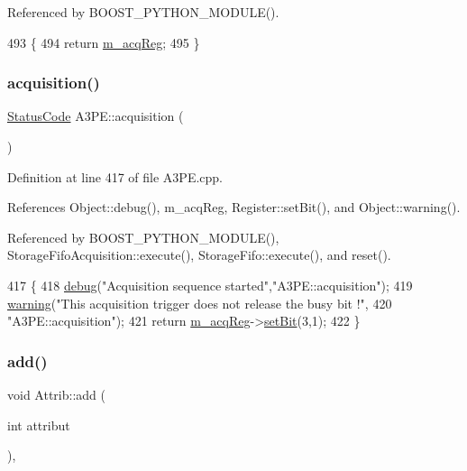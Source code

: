 Referenced by B\+O\+O\+S\+T\+\_\+\+P\+Y\+T\+H\+O\+N\+\_\+\+M\+O\+D\+U\+L\+E().


\begin{DoxyCode}
493                     \{
494     \textcolor{keywordflow}{return} \hyperlink{classA3PE_abaf426f4c9192537117b77f9f4821e04}{m\_acqReg};
495   \}
\end{DoxyCode}
\mbox{\label{classA3PE_a035886b99761cc4f3c342ff0b4e44f59}} 
\subsubsection{\texorpdfstring{acquisition()}{acquisition()}}
{\footnotesize\ttfamily \hyperlink{classStatusCode}{Status\+Code} A3\+P\+E\+::acquisition (\begin{DoxyParamCaption}{ }\end{DoxyParamCaption})}



Definition at line 417 of file A3\+P\+E.\+cpp.



References Object\+::debug(), m\+\_\+acq\+Reg, Register\+::set\+Bit(), and Object\+::warning().



Referenced by B\+O\+O\+S\+T\+\_\+\+P\+Y\+T\+H\+O\+N\+\_\+\+M\+O\+D\+U\+L\+E(), Storage\+Fifo\+Acquisition\+::execute(), Storage\+Fifo\+::execute(), and reset().


\begin{DoxyCode}
417                             \{
418   \hyperlink{classObject_aac010553f022165573714b7014a15f0d}{debug}(\textcolor{stringliteral}{"Acquisition sequence started"},\textcolor{stringliteral}{"A3PE::acquisition"});
419   \hyperlink{classObject_a65cd4fda577711660821fd2cd5a3b4c9}{warning}(\textcolor{stringliteral}{"This acquisition trigger does not release the busy bit !"},
420       \textcolor{stringliteral}{"A3PE::acquisition"});
421   \textcolor{keywordflow}{return} \hyperlink{classA3PE_abaf426f4c9192537117b77f9f4821e04}{m\_acqReg}->\hyperlink{classRegister_ab094246dd12aa7e0aa0ca917f4e70b31}{setBit}(3,1);
422 \}
\end{DoxyCode}
\mbox{\label{classAttrib_a235f773af19c900264a190b00a3b4ad7}} 
\subsubsection{\texorpdfstring{add()}{add()}}
{\footnotesize\ttfamily void Attrib\+::add (\begin{DoxyParamCaption}\item[{int}]{attribut }\end{DoxyParamCaption})\hspace{0.3cm}{\ttfamily [inline]}, {\ttfamily [inherited]}}

